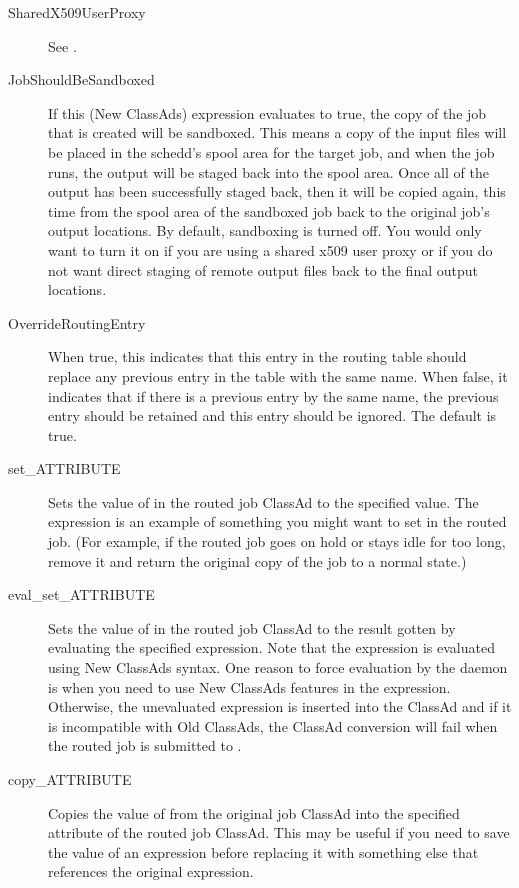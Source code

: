 \begin{description}
\begin{description}
\item[SharedX509UserProxy] See .

\item[JobShouldBeSandboxed] If this (New ClassAds) expression
evaluates to true, the copy of the job that is created will be
sandboxed.  This means a copy of the input files will be placed in the
schedd's spool area for the target job, and when the job runs, the
output will be staged back into the spool area.  Once all of the
output has been successfully staged back, then it will be copied
again, this time from the spool area of the sandboxed job back to the
original job's output locations.  By default, sandboxing is turned
off.  You would only want to turn it on if you are using a shared x509
user proxy or if you do not want direct staging of remote output files
back to the final output locations.

\item[OverrideRoutingEntry] When true, this indicates that this entry
in the routing table should replace any previous entry in the table
with the same name.  When false, it indicates that if there is a
previous entry by the same name, the previous entry should be retained
and this entry should be ignored.  The default is true.

\item[set\_ATTRIBUTE] Sets the value of  in the routed
job ClassAd to the specified value.  The 
expression is an example of something you might want to set in the
routed job.  (For example, if the routed job goes on hold or stays
idle for too long, remove it and return the original copy of the job to
a normal state.)

\item[eval\_set\_ATTRIBUTE] Sets the value of  in the
routed job ClassAd to the result gotten by evaluating the specified
expression.  Note that the expression is evaluated using New ClassAds
syntax.  One reason to force evaluation by the  daemon is when you need
to use New ClassAds features in the expression.  Otherwise, the
unevaluated expression is inserted into the ClassAd and if it is
incompatible with Old ClassAds, the ClassAd conversion will fail when
the routed job is submitted to .

\item[copy\_ATTRIBUTE] Copies the value of  from the
original job ClassAd into the specified attribute of the routed job
ClassAd.  This may be useful if you need to save the value of an
expression before replacing it with something else that references the
original expression.


\end{description}
\end{description}
